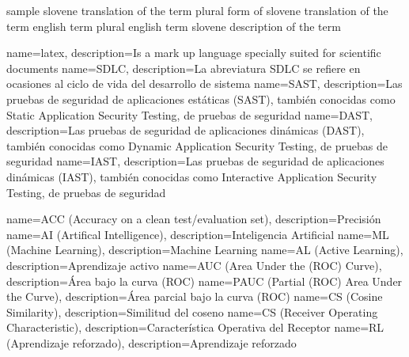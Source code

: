 \makeglossaries


\addterm
{sample}%
{slovene translation of the term}%
{plural form of slovene translation of the term}%
{english term}%
{plural english term}%
{slovene description of the term}


        {name={latex},      description={Is a mark up language specially suited for scientific documents}}
         {name={SDLC},       description={La abreviatura SDLC se refiere en ocasiones al ciclo de vida del desarrollo de sistema}}
         {name={SAST},       description={Las pruebas de seguridad de aplicaciones estáticas (SAST), también conocidas como Static Application Security Testing, de pruebas de seguridad}}
         {name={DAST},       description={Las pruebas de seguridad de aplicaciones dinámicas (DAST), también conocidas como Dynamic Application Security Testing, de pruebas de seguridad}}
         {name={IAST},       description={Las pruebas de seguridad de aplicaciones dinámicas (IAST), también conocidas como Interactive Application Security Testing, de pruebas de seguridad}}


    {name={ACC (Accuracy on a clean test/evaluation set)},    description={Precisión}}
     {name={AI (Artifical Intelligence)},                      description={Inteligencia Artificial}}
     {name={ML (Machine Learning)},                            description={Machine Learning}}
     {name={AL (Active Learning)},                             description={Aprendizaje activo}}
    {name={AUC (Area Under the (ROC) Curve)},                 description={Área bajo la curva (ROC)}}
   {name={PAUC (Partial (ROC) Area Under the Curve)},        description={Área parcial bajo la curva (ROC)}}
     {name={CS (Cosine Similarity)},                           description={Similitud del coseno}}
    {name={CS (Receiver Operating Characteristic)},           description={Característica Operativa del Receptor}}
     {name={RL (Aprendizaje reforzado)},                       description={Aprendizaje reforzado}}


